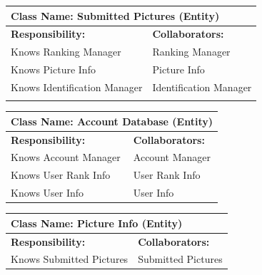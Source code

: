 \documentclass[]{article}
\begin{document}
	\begin{table}[H]
		\centering
		\begin{tabular}{|p{8cm}|p{8cm}|}
		\hline 
		 \multicolumn{2}{|l|}{\textbf{Class Name:} Submitted Pictures (Entity)} \\
		\hline
		\textbf{Responsibility:} & \textbf{Collaborators:} \\
		\hline
		Knows Ranking Manager & Ranking Manager \\
		Knows Picture Info & Picture Info \\
		Knows Identification Manager & Identification Manager \\
		\vspace{1in} & \\
		\hline
		\end{tabular}
	\end{table}


	\begin{table}[H]
		\centering
		\begin{tabular}{|p{8cm}|p{8cm}|}
		\hline 
		 \multicolumn{2}{|l|}{\textbf{Class Name:} Account Database (Entity)} \\
		\hline
		\textbf{Responsibility:} & \textbf{Collaborators:} \\
		\hline 
            Knows Account Manager & Account Manager\\ 
            Knows User Rank Info & User Rank Info \\
            Knows User Info & User Info       
		\vspace{1in} \\
		\hline
		\end{tabular}
	\end{table}

	\begin{table}[H]
		\centering
		\begin{tabular}{|p{8cm}|p{8cm}|}
		\hline 
		 \multicolumn{2}{|l|}{\textbf{Class Name:} Picture Info (Entity)} \\
		\hline
		\textbf{Responsibility:} & \textbf{Collaborators:} \\
		\hline
            Knows Submitted Pictures & Submitted Pictures 
		\vspace{1in} \\
		\hline
		\end{tabular}
	\end{table}
\end{document}
